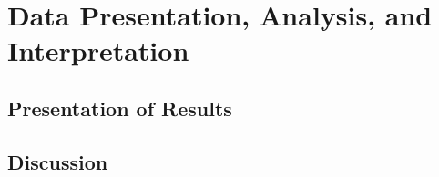 \documentclass[../../1_thesis]{subfiles}
\begin{document}
\chapter{Data Presentation, Analysis, and Interpretation}

\section{Presentation of Results}

\section{Discussion}
\end{document}
